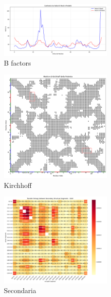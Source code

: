 \documentclass{article}
\begin{document}
\begin{figure}[H]
    \centering
    \includegraphics[width=0.5\textwidth]{"images/3LNXConfronto tra Fattori B Reali e Predetti.png"}
    \caption{B factors}
\end{figure}
\begin{figure}[H]
    \centering
    \includegraphics[width=0.5\textwidth]{"images/3LNX_Matrice di Kirchhoff della Proteina.png"}
    \caption{Kirchhoff}
\end{figure}
\begin{figure}[H]
    \centering
    \includegraphics[width=0.5\textwidth]{"images/3LNXanalyze_secondary_structure_transfer_entropy.png"}
    \caption{Secondaria}
\end{figure}
\end{document}
